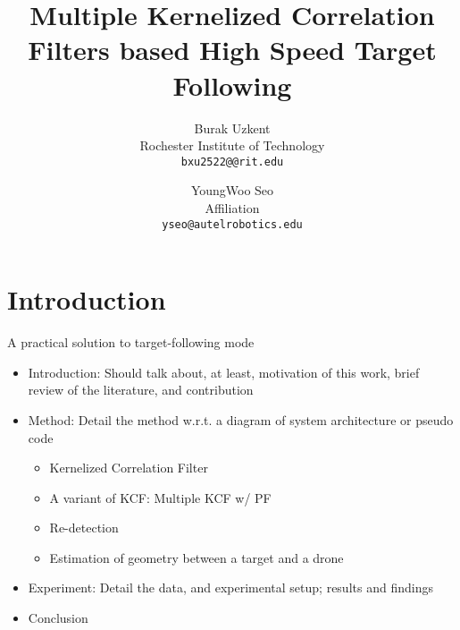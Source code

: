 \documentclass[10pt,twocolumn,letterpaper]{article}
\begin{document}
\title{Multiple Kernelized Correlation Filters based High Speed Target Following}

\author{Burak Uzkent\\
Rochester Institute of Technology\\
{\tt\small bxu2522@@rit.edu}
\and
YoungWoo Seo\\
Affiliation\\
{\tt\small yseo@autelrobotics.edu}
}

\maketitle

\begin{abstract}

\end{abstract}

\section{Introduction}

A practical solution to target-following mode

\begin{itemize}
\item Introduction: Should talk about, at least, motivation of this
  work, brief review of the literature, and contribution
\item Method: Detail the method w.r.t. a diagram of system
  architecture or pseudo code
\begin{itemize}
\item Kernelized Correlation Filter
\item A variant of KCF: Multiple KCF w/ PF
\item Re-detection
\item Estimation of geometry between a target and a drone
\end{itemize}
\item Experiment: Detail the data, and experimental setup; results and findings
\item Conclusion
\end{itemize}
\end{document}
